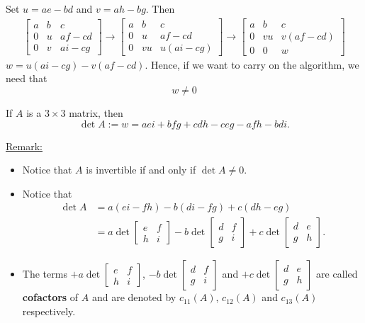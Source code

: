 \documentclass[20pt,a4paper]{extarticle}
\newcommand{\ra}{\rightarrow}
\newcounter{definition}
\newcounter{algo}
\begin{document}
Set $u = ae - bd$ and $v = ah - bg$. Then
\begin{align*}
 \begin{bmatrix} a & b & c \\ 0 & u & af - cd \\ 0 & v & ai - cg \end{bmatrix} \ra \begin{bmatrix} a & b & c \\ 0 & u & af - cd \\ 0 & vu & u (ai - cg) \end{bmatrix} \ra \begin{bmatrix} a & b & c \\ 0 & vu & v(af - cd) \\ 0 & 0 & w \end{bmatrix}
 \end{align*}
$w = u (ai - cg) - v(af - cd)$. Hence, if we want to carry on the algorithm, we need that
	\[
		w \neq 0 
	\]

\newpage 

\begin{definition}
If $A$ is a $3 \times 3$ matrix, then
	\[
		\det A := w = aei + bfg + cdh - ceg - afh - bdi .
	\]
\end{definition}

\underline{Remark:}
	\begin{itemize}
		\item Notice that $A$ is invertible if and only if $\det A \neq 0$.
		\item Notice that
			\begin{align*}
				\det A &= a (ei - fh) - b (di - fg) + c (dh - eg) \\ 
				&= a \det \begin{bmatrix} e & f \\ h & i \end{bmatrix} - b \det \begin{bmatrix} d & f \\ g & i \end{bmatrix} + c \det \begin{bmatrix} d & e \\ g & h \end{bmatrix} .
			\end{align*}
		\item The terms $+a \det \begin{bmatrix} e & f \\ h & i \end{bmatrix}$, $- b \det \begin{bmatrix} d & f \\ g & i \end{bmatrix}$ and $+c \det \begin{bmatrix} d & e \\ g & h \end{bmatrix}$ are called \textbf{cofactors} of $A$ and are denoted by $c_{11} (A)$, $c_{12} (A)$ and $c_{13} (A)$ respectively.
	\end{itemize}
\end{document}
